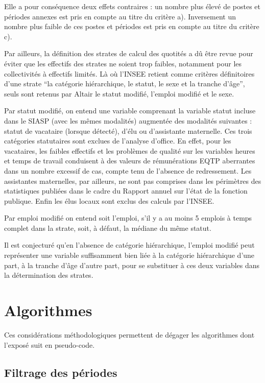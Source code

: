 \documentclass[]{article}
\begin{document}
Elle a pour conséquence deux effets contraires : un nombre plus élevé de
postes et périodes annexes est pris en compte au titre du critère a).
Inversement un nombre plus faible de ces postes et périodes est pris en
compte au titre du critère c).

Par ailleurs, la définition des strates de calcul des quotités a dû être
revue pour éviter que les effectifs des strates ne soient trop faibles,
notamment pour les collectivités à effectifs limités. Là où l'INSEE
retient comme critères définitoires d'une strate ``la catégorie
hiérarchique, le statut, le sexe et la tranche d'âge'', seuls sont
retenus par Altair le statut modifié, l'emploi modifié et le sexe.

Par statut modifié, on entend une variable comprenant la variable statut
incluse dans le SIASP (avec les mêmes modalités) augmentée des modalités
suivantes : statut de vacataire (lorsque détecté), d'élu ou d'assistante
maternelle. Ces trois catégories statutaires sont exclues de l'analyse
d'office. En effet, pour les vacataires, les faibles effectifs et les
problèmes de qualité sur les variables heures et temps de travail
conduisent à des valeurs de rémunérations EQTP aberrantes dans un nombre
excessif de cas, compte tenu de l'absence de redressement. Les
assistantes maternelles, par ailleurs, ne sont pas comprises dans les
périmètres des statistiques publiées dans le cadre du Rapport annuel sur
l'état de la fonction publique. Enfin les élus locaux sont exclus des
calculs par l'INSEE.

Par emploi modifié on entend soit l'emploi, s'il y a au moins 5 emplois
à temps complet dans la strate, soit, à défaut, la médiane du même
statut.

Il est conjecturé qu'en l'absence de catégorie hiérarchique, l'emploi
modifié peut représenter une variable suffisamment bien liée à la
catégorie hiérarchique d'une part, à la tranche d'âge d'autre part, pour
se substituer à ces deux variables dans la détermination des strates.

\section{Algorithmes}\label{algorithmes}

Ces considérations méthodologiques permettent de dégager les algorithmes
dont l'exposé suit en pseudo-code.

\subsection{Filtrage des périodes}\label{filtrage-des-periodes}
\end{document}
